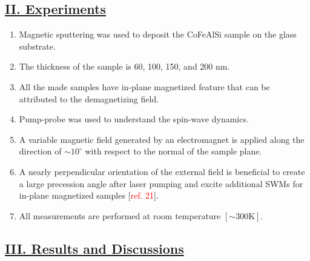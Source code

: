 \subsection*{\underline{II. Experiments}}
\begin{enumerate}
    \item Magnetic sputtering was used to deposit the CoFeAlSi sample on the glass substrate.
    \item The thickness of the sample is 60, 100, 150, and 200 nm.
    \item All the made samples have in-plane magnetized feature that can be attributed to the demagnetizing field.
    \item Pump-probe was used to understand the spin-wave dynamics.
    \item A variable magnetic field generated by an electromagnet is applied along the direction of $\sim 10^\circ$ with respect to the normal of the sample plane.
    \item A nearly perpendicular orientation of the external field is beneficial to create a large precession angle after laser pumping and excite additional SWMs for in-plane magnetized samples [\textcolor{red}{ref. 21}].
    \item All measurements are performed at room temperature $[\mathrm{\sim300 K}]$.
\end{enumerate}
\subsection*{\underline{III. Results and Discussions}}
